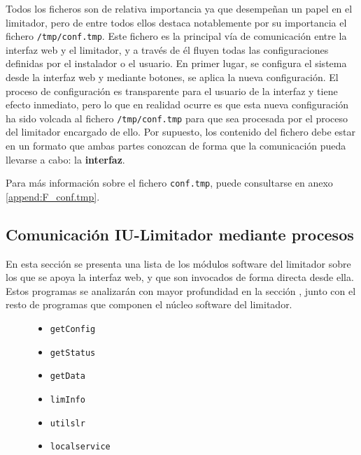 Todos los ficheros son de relativa importancia ya que desempeñan un papel en el limitador, pero de entre todos ellos destaca notablemente por su importancia el fichero \verb|/tmp/conf.tmp|. Este fichero es la principal vía de comunicación entre la interfaz web y el limitador, y a través de él fluyen todas las configuraciones definidas por el instalador o el usuario. En primer lugar, se configura el sistema desde la interfaz web y mediante botones, se aplica la nueva configuración. El proceso de configuración es transparente para el usuario de la interfaz y tiene efecto inmediato, pero lo que en realidad ocurre es que esta nueva configuración ha sido volcada al fichero \verb|/tmp/conf.tmp| para que sea procesada por el proceso del limitador encargado de ello. Por supuesto, los contenido del fichero debe estar en un formato que ambas partes conozcan de forma que la comunicación pueda llevarse a cabo: la \textbf{interfaz}.

Para más información sobre el fichero \verb|conf.tmp|, puede consultarse en anexo \ref{append:F_conf.tmp}.

\subsection{Comunicación IU-Limitador mediante procesos} \label{sec:iu-limitador-procesos}

En esta sección se presenta una lista de los módulos software del limitador sobre los que se apoya la interfaz web, y que son invocados de forma directa desde ella. Estos programas se analizarán con mayor profundidad en la sección , junto con el resto de programas que componen el núcleo software del limitador.

\begin{figure}[ht]
    \begin{minipage}[b]{.45\textwidth}
        \begin{itemize}
            \item \verb|getConfig|
            \item \verb|getStatus|
            \item \verb|getData|
        \end{itemize}
    \end{minipage}
    \hfill
    \begin{minipage}[b]{.45\textwidth}
        \begin{itemize}
            \item \verb|limInfo|
            \item \verb|utilslr|
            \item \verb|localservice|
        \end{itemize}
    \end{minipage}
\end{figure}

